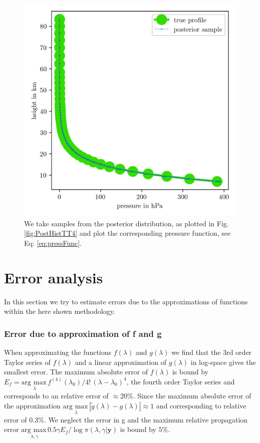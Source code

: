 \begin{figure}[ht!]
	\centering
	\includegraphics{PressPostMeanSigm.png}
	\caption[Pressure posterior samples.]{We take samples from the posterior distribution, as plotted in Fig. \ref{fig:PostHistTT4} and plot the corresponding pressure function, see Eq: \ref{eq:pressFunc}.}
	\label{fig:PressPost}
\end{figure}

\section{Error analysis}
In this section we try to estimate errors due to the approximations of functions within the here shown methodology.

\subsubsection{Error due to approximation of f and g}
When approximating the functions $f(\lambda)$ and $g(\lambda)$ we find that the 3rd order Taylor series of $f(\lambda)$ and a linear approximation of $g(\lambda)$ in log-space gives the smallest error.
The maximum absolute error of $f(\lambda)$ is bound by $E_f = \underset{\lambda}{\text{arg max}\,} f^{(4)}(\lambda_0)/ 4! \, (\lambda - \lambda_{0} )^4$, the fourth order Taylor series and corresponds to an relative error of $\approx 20\%$.
Since the maximum absolute error of the approximation $\underset{\lambda}{\text{arg max}\,}|\tilde{g}(\lambda) - g(\lambda) | \approx 1$ and corresponding to relative error of $0.3\%$. 
We neglect the error in g and the maximum relative propagation error $\underset{\lambda, \gamma}{\text{arg max}\,} 0.5 \gamma  E_f / \log{\pi{(\lambda ,\gamma | \bm{y})}} $ is bound by $5\%$.

